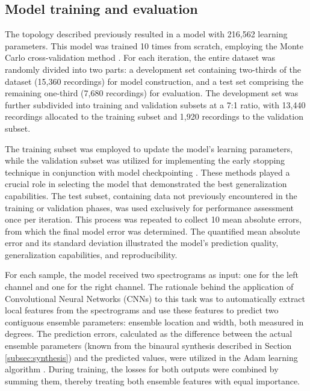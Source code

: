 \documentclass{article}
\begin{document}
\subsection{Model training and evaluation}
\label{subsec:training_evaluation}

The topology described previously resulted in a model with 216,562 learning parameters. This model was trained 10 times from scratch, employing the Monte Carlo cross-validation method \parencite{kuhn_applied_2013}. For each iteration, the entire dataset was randomly divided into two parts: a development set containing two-thirds of the dataset (15,360 recordings) for model construction, and a test set comprising the remaining one-third (7,680 recordings) for evaluation. The development set was further subdivided into training and validation subsets at a 7:1 ratio, with 13,440 recordings allocated to the training subset and 1,920 recordings to the validation subset.

The training subset was employed to update the model's learning parameters, while the validation subset was utilized for implementing the early stopping technique \parencite{pocock_practical_1989, morgan_generalization_1989} in conjunction with model checkpointing \parencite{eisenman_check-n-run_2020}. These methods played a crucial role in selecting the model that demonstrated the best generalization capabilities. The test subset, containing data not previously encountered in the training or validation phases, was used exclusively for performance assessment once per iteration. This process was repeated to collect 10 mean absolute errors, from which the final model error was determined. The quantified mean absolute error and its standard deviation illustrated the model's prediction quality, generalization capabilities, and reproducibility.

For each sample, the model received two spectrograms as input: one for the left channel and one for the right channel. The rationale behind the application of Convolutional Neural Networks (CNNs) to this task was to automatically extract local features from the spectrograms and use these features to predict two contiguous ensemble parameters: ensemble location and width, both measured in degrees. The prediction errors, calculated as the difference between the actual ensemble parameters (known from the binaural synthesis described in Section \ref{subsec:synthesis}) and the predicted values, were utilized in the Adam learning algorithm \parencite{kingma_adam_2014}. During training, the losses for both outputs were combined by summing them, thereby treating both ensemble features with equal importance.
\end{document}
